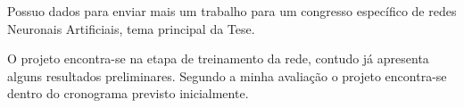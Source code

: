 Possuo dados para enviar mais um trabalho para um congresso específico de redes Neuronais Artificiais, tema principal da Tese. 

\begin{table}[H]
	\centering
	
	\begin{small}
		
		\setlength{\tabcolsep}{2pt}
		
	\end{small}
	\caption{Cronograma das atividades previstas para o segundo biênio.}
	\label{t2_cronograma}
\end{table}

O projeto encontra-se na etapa de treinamento da rede, contudo já apresenta alguns resultados preliminares. Segundo a minha avaliação o projeto encontra-se dentro do cronograma previsto inicialmente. 